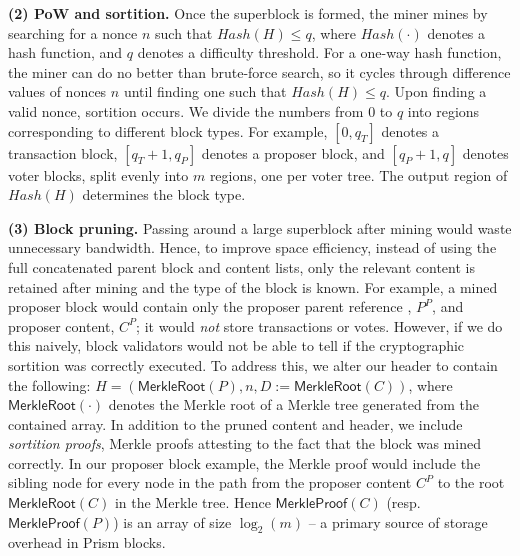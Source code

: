 \noindent \textbf{(2) PoW and sortition.}
Once the superblock is formed, the miner mines by searching for a nonce $n$ such that $Hash( H)\leq q$, where $Hash(\cdot)$ denotes a hash function, and $q$ denotes a difficulty threshold. 
For a one-way hash function, the miner can do no better than brute-force search, so it cycles through difference values of nonces $n$ until  finding one such that $Hash(H) \leq q$. Upon finding a valid nonce,  sortition  occurs. 
We divide the numbers from $0$ to $q$ into regions corresponding to different block types. 
For example, $[0,q_T]$ denotes a transaction block, $[q_T+1,q_P]$ denotes a  proposer block, and $[q_P+1,q]$ denotes voter blocks,  split evenly into  $m$ regions, one per voter tree.
The output region of $Hash(H)$ determines the block type.


\noindent \textbf{(3) Block pruning.}
Passing around a large superblock after mining would waste unnecessary bandwidth. 
Hence, to improve space efficiency, instead of using the full concatenated parent block and content lists, only the relevant content is retained after mining and the type of the block is known.
For example, a mined proposer block would contain only the proposer parent reference , $P^P$, and proposer content, $ C^P$; it would \emph{not} store transactions or votes.
However,  if we do this naively, block validators would not be able to tell if the cryptographic sortition was correctly executed.
To address this, we alter our header to contain the following:
$H=\left(\textsf{MerkleRoot}(P), n, D := \textsf{MerkleRoot}(C)\right)$, 
 where $\textsf{MerkleRoot}(\cdot)$ denotes the Merkle root of a Merkle tree \cite{merkle} 
generated from the contained array.
In addition to the pruned content and header, we include \textit{sortition proofs}, Merkle proofs attesting to the fact that the block  was mined correctly.
In our proposer block example, the Merkle proof would include the sibling node for every  node in the path from the proposer content $C^P$ to the root $\textsf{MerkleRoot}(C)$ in the Merkle tree. 
Hence $\textsf{MerkleProof}( C)$ (resp. $\textsf{MerkleProof}(P)$) is an array of  size $\log_2 (m)$ -- a primary source of storage overhead in Prism blocks. 


